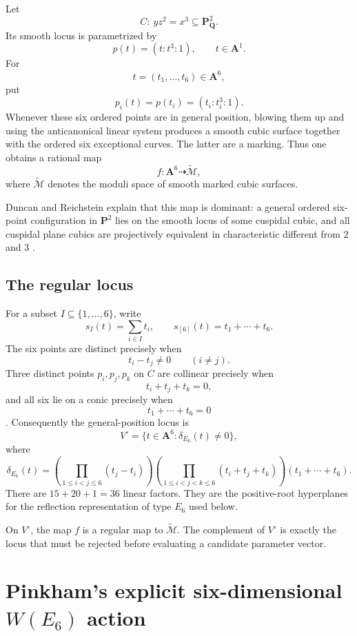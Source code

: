\documentclass[11pt]{article}
\newcommand{\QQ}{\mathbf{Q}}
\newcommand{\PP}{\mathbf{P}}
\newcommand{\Aff}{\mathbf{A}}
\newcommand{\tcM}{\widetilde{\mathcal{M}}}
\newcommand{\deltaE}{\delta_{E_6}}
\begin{document}
Let
\[
  C:\ yz^2=x^3\subseteq\PP^2_\QQ.
\]
Its smooth locus is parametrized by
\[
  p(t)=(t:t^3:1),\qquad t\in\Aff^1.
\]
For
\[
  t=(t_1,\ldots,t_6)\in\Aff^6,
\]
put
\[
  p_i(t)=p(t_i)=(t_i:t_i^3:1).
\]
Whenever these six ordered points are in general position, blowing them up and
using the anticanonical linear system produces a smooth cubic surface together with
the ordered six exceptional curves.  The latter are a marking.  Thus one obtains a
rational map
\[
  f:\Aff^6\dashrightarrow\tcM,
\]
where $\tcM$ denotes the moduli space of smooth marked cubic surfaces.

Duncan and Reichstein explain that this map is dominant: a general ordered
six-point configuration in $\PP^2$ lies on the smooth locus of some cuspidal cubic,
and all cuspidal plane cubics are projectively equivalent in characteristic different
from $2$ and $3$ \cite[Lemma 6.1]{DR-PR}.

\subsection{The regular locus}
\label{sec:regular-locus}

For a subset $I\subseteq\{1,\ldots,6\}$, write
\[
  s_I(t)=\sum_{i\in I}t_i,
  \qquad
  s_{[6]}(t)=t_1+\cdots+t_6.
\]
The six points are distinct precisely when
\[
  t_i-t_j\neq0\qquad(i\neq j).
\]
Three distinct points $p_i,p_j,p_k$ on $C$ are collinear precisely when
\[
  t_i+t_j+t_k=0,
\]
and all six lie on a conic precisely when
\[
  t_1+\cdots+t_6=0
\]
\cite[Lemma 6.1]{DR-PR}.  Consequently the general-position locus is
\[
  V^\circ=\{t\in\Aff^6:\deltaE(t)\neq0\},
\]
where
\begin{equation}
 \boxed{
  \deltaE(t)=
  \left(\prod_{1\leq i<j\leq6}(t_j-t_i)\right)
  \left(\prod_{1\leq i<j<k\leq6}(t_i+t_j+t_k)\right)
  (t_1+\cdots+t_6).
 }
 \label{eq:E6-discriminant}
\end{equation}
There are $15+20+1=36$ linear factors.  They are the positive-root hyperplanes for
the reflection representation of type $E_6$ used below.

On $V^\circ$, the map $f$ is a regular map to $\tcM$.  The complement of
$V^\circ$ is exactly the locus that must be rejected before evaluating a candidate
parameter vector.

\section{Pinkham's explicit six-dimensional $W(E_6)$ action}
\label{sec:pinkham-action}
\end{document}
